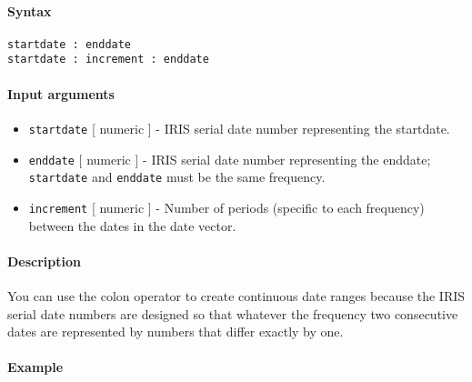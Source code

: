 


	\paragraph{Syntax}

\begin{verbatim}
startdate : enddate
startdate : increment : enddate
\end{verbatim}

\paragraph{Input arguments}

\begin{itemize}
\item
  \texttt{startdate} {[} numeric {]} - IRIS serial date number
  representing the startdate.
\item
  \texttt{enddate} {[} numeric {]} - IRIS serial date number
  representing the enddate; \texttt{startdate} and \texttt{enddate} must
  be the same frequency.
\item
  \texttt{increment} {[} numeric {]} - Number of periods (specific to
  each frequency) between the dates in the date vector.
\end{itemize}

\paragraph{Description}

You can use the colon operator to create continuous date ranges because
the IRIS serial date numbers are designed so that whatever the frequency
two consecutive dates are represented by numbers that differ exactly by
one.

\paragraph{Example}


